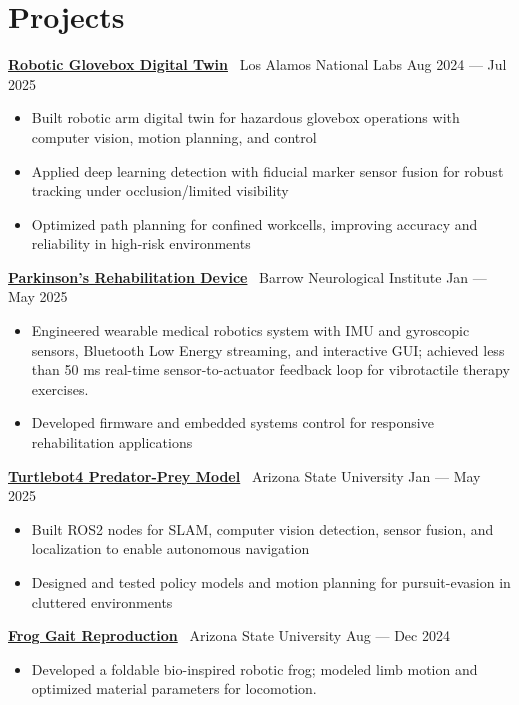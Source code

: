 \documentclass[10pt]{article}
\begin{document}
\section*{Projects}
\textbf{\href{https://github.com/MGross21/glovebox-digitaltwin}{Robotic Glovebox Digital Twin}} \textbar\ Los Alamos National Labs \hfill Aug 2024 --- Jul 2025
\begin{itemize}
  \item Built robotic arm digital twin for hazardous glovebox operations with computer vision, motion planning, and control
  \item Applied deep learning detection with fiducial marker sensor fusion for robust tracking under occlusion/limited visibility
  \item Optimized path planning for confined workcells, improving accuracy and reliability in high-risk environments
\end{itemize}
\textbf{\href{https://github.com/MGross21/syncstride-wearable}{Parkinson's Rehabilitation Device}} \textbar\ Barrow Neurological Institute \hfill Jan --- May 2025
\begin{itemize}
  \item Engineered wearable medical robotics system with IMU and gyroscopic sensors, Bluetooth Low Energy streaming, and interactive GUI; achieved less than 50 ms real-time sensor-to-actuator feedback loop for vibrotactile therapy exercises.
  \item Developed firmware and embedded systems control for responsive rehabilitation applications
\end{itemize}
\textbf{\href{https://ASU-RAS598-2025-S-TEAM02.github.io}{Turtlebot4 Predator-Prey Model}} \textbar\ Arizona State University \hfill Jan --- May 2025
\begin{itemize}
  \item Built ROS2 nodes for SLAM, computer vision detection, sensor fusion, and localization to enable autonomous navigation
  \item Designed and tested policy models and motion planning for pursuit-evasion in cluttered environments
\end{itemize}
\textbf{\href{https://github.com/MGross21/Robotic-Jumping-Frog}{Frog Gait Reproduction}} \textbar\ Arizona State University \hfill Aug --- Dec 2024
\begin{itemize}
  \item Developed a foldable bio-inspired robotic frog; modeled limb motion and optimized material parameters for locomotion.
\end{itemize}
\end{document}
